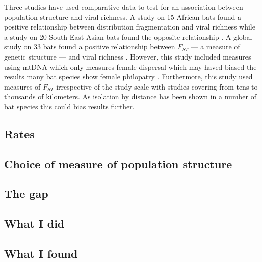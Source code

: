 Three studies have used comparative data to test for an association between population structure and viral richness.
A study on 15 African bats found a positive relationship between distribution fragmentation and viral richness \cite{maganga2014bat} while a study on 20 South-East Asian bats found the opposite relationship \cite{gay2014parasite}. 
A global study on 33 bats found a positive relationship between $F_{ST}$ --- a measure of genetic structure --- and viral richness \cite{turmelle2009correlates}. 
However, this study included measures using mtDNA which only measures female dispersal which may haved biased the results many bat species show female philopatry \cite{kerth2002extreme, hulva2010mechanisms}.
Furthermore, this study used measures of $F_{ST}$ irrespective of the study scale with studies covering from tens \cite{mccracken1981social} to thousands \cite{petit1999male} of kilometers.
As isolation by distance has been shown in a number of bat species \cite{burland1999population, hulva2010mechanisms, o2015genetic} this could bias results further.




\subsection{Rates}



\subsection{Choice of measure of population structure}









\subsection{The gap}




\subsection{What I did}




\subsection{What I found}




